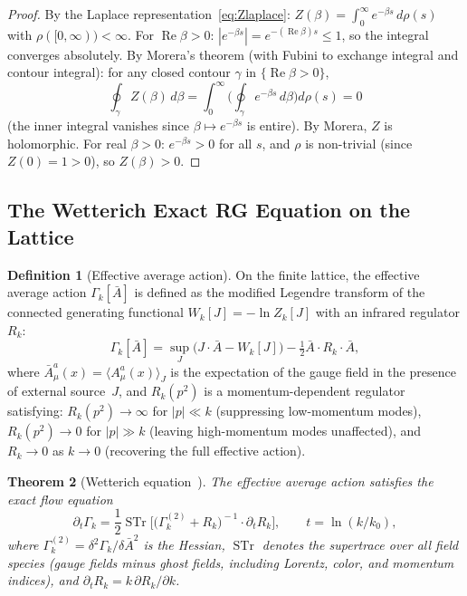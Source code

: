 \documentclass[12pt,a4paper]{article}
\theoremstyle{plain}
\newtheorem{theorem}{Theorem}[section]
\theoremstyle{definition}
\newtheorem{definition}[theorem]{Definition}
\theoremstyle{remark}
\begin{document}
\begin{proof}
By the Laplace representation~\eqref{eq:Zlaplace}: $Z(\beta)=\int_0^\infty e^{-\beta s}\,d\rho(s)$ with $\rho([0,\infty))<\infty$. For $\operatorname{Re}\beta>0$: $|e^{-\beta s}|=e^{-(\operatorname{Re}\beta)s}\leq 1$, so the integral converges absolutely. By Morera's theorem (with Fubini to exchange integral and contour integral): for any closed contour $\gamma$ in $\{\operatorname{Re}\beta>0\}$,
\begin{equation}
\oint_\gamma Z(\beta)\,d\beta = \int_0^\infty\bigg(\oint_\gamma e^{-\beta s}\,d\beta\bigg)d\rho(s) = 0
\end{equation}
(the inner integral vanishes since $\beta\mapsto e^{-\beta s}$ is entire). By Morera, $Z$ is holomorphic. For real $\beta>0$: $e^{-\beta s}>0$ for all $s$, and $\rho$ is non-trivial (since $Z(0)=1>0$), so $Z(\beta)>0$.
\end{proof}

\subsection{The Wetterich Exact RG Equation on the Lattice}\label{sec:ERG}

\begin{definition}[Effective average action]\label{def:Gamma}
On the finite lattice, the effective average action $\Gamma_k[\bar{A}]$ is defined as the modified Legendre transform of the connected generating functional $W_k[J]=-\ln Z_k[J]$ with an infrared regulator $R_k$:
\begin{equation}\label{eq:Gammadef}
\Gamma_k[\bar{A}] = \sup_J\big(J\cdot\bar{A} - W_k[J]\big) - \tfrac{1}{2}\bar{A}\cdot R_k\cdot\bar{A},
\end{equation}
where $\bar{A}_\mu^a(x)=\langle A_\mu^a(x)\rangle_J$ is the expectation of the gauge field in the presence of external source~$J$, and $R_k(p^2)$ is a momentum-dependent regulator satisfying: $R_k(p^2)\to\infty$ for $|p|\ll k$ (suppressing low-momentum modes), $R_k(p^2)\to 0$ for $|p|\gg k$ (leaving high-momentum modes unaffected), and $R_k\to 0$ as $k\to 0$ (recovering the full effective action).
\end{definition}

\begin{theorem}[Wetterich equation~\cite{Wetterich1993}]\label{thm:ERG}
The effective average action satisfies the exact flow equation
\begin{equation}\label{eq:ERG}
\partial_t\Gamma_k = \frac{1}{2}\operatorname{STr}\!\bigg[\Big(\Gamma_k^{(2)} + R_k\Big)^{\!-1}\cdot\partial_t R_k\bigg], \qquad t = \ln(k/k_0),
\end{equation}
where $\Gamma_k^{(2)}=\delta^2\Gamma_k/\delta\bar{A}^2$ is the Hessian, $\operatorname{STr}$ denotes the supertrace over all field species (gauge fields minus ghost fields, including Lorentz, color, and momentum indices), and $\partial_t R_k = k\,\partial R_k/\partial k$.
\end{theorem}
\end{document}
